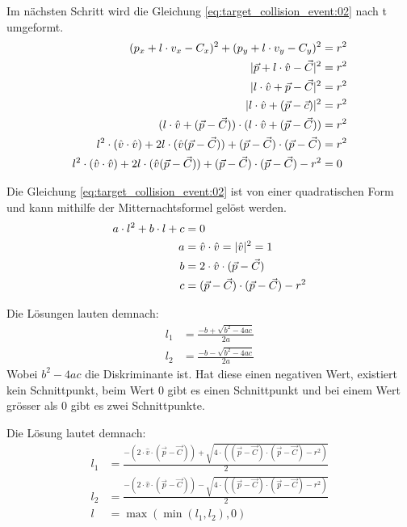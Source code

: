 Im nächsten Schritt wird die Gleichung \ref{eq:target_collision_event:02} nach t umgeformt.
\begin{align}
    (p_x + l \cdot v_x - C_x)^2 + (p_y + l \cdot v_y - C_y)^2 &= r^2\\
    \lvert \vec{p} + l \cdot \hat{v} - \vec{C} \rvert^2 &= r^2\\
    \lvert l \cdot \hat{v} + \vec{p} - \vec{C} \rvert^2 &= r^2\\
    \lvert l \cdot \hat{v} + (\vec{p} - \vec{c}) \rvert^2 &= r^2\\
    (l \cdot \hat{v} + (\vec{p} - \vec{C})) \cdot (l \cdot \hat{v} + (\vec{p} - \vec{C})) &= r^2\\
    l^2 \cdot (\hat{v} \cdot \hat{v}) + 2l \cdot (\hat{v}(\vec{p} - \vec{C})) + (\vec{p} - \vec{C}) \cdot (\vec{p} - \vec{C}) &= r^2\\
    l^2 \cdot (\hat{v} \cdot \hat{v}) + 2l \cdot (\hat{v}(\vec{p} - \vec{C})) + (\vec{p} - \vec{C}) \cdot (\vec{p} - \vec{C}) - r^2 &= 0\label{eq:target_collision_event:03}
\end{align}

Die Gleichung \ref{eq:target_collision_event:02} ist von einer quadratischen Form und kann mithilfe der Mitternachtsformel
gelöst werden.
\begin{align}
    a \cdot l^2 + b \cdot l + c &= 0\\
    a &= \hat{v} \cdot \hat{v} = \lvert \hat{v} \rvert^2 = 1\\
    b &= 2 \cdot \hat{v} \cdot (\vec{p} - \vec{C})\\
    c &= (\vec{p} - \vec{C}) \cdot (\vec{p} - \vec{C}) - r^2
\end{align}

Die Lösungen lauten demnach:
\begin{align}
    l_1 &= \frac{-b + \sqrt{b^2 - 4ac}}{2a}\\
    l_2 &= \frac{-b - \sqrt{b^2 - 4ac}}{2a}
\end{align}
Wobei $b^2 - 4ac$ die Diskriminante ist. Hat diese einen negativen Wert, existiert kein Schnittpunkt,
beim Wert $0$ gibt es einen Schnittpunkt und bei einem Wert grösser als $0$ gibt es zwei Schnittpunkte.

Die Lösung lautet demnach:
\begin{align}
    l_1 &= \frac{-(2 \cdot \hat{v} \cdot (\vec{p} - \vec{C})) + \sqrt{4 \cdot ((\vec{p} - \vec{C}) \cdot (\vec{p} - \vec{C}) - r^2)}}{2}\\
    l_2 &= \frac{-(2 \cdot \hat{v} \cdot (\vec{p} - \vec{C})) - \sqrt{4 \cdot ((\vec{p} - \vec{C}) \cdot (\vec{p} - \vec{C}) - r^2)}}{2}\\
    l &= \max{(\min{(l_1, l_2)}, 0)}
\end{align}

